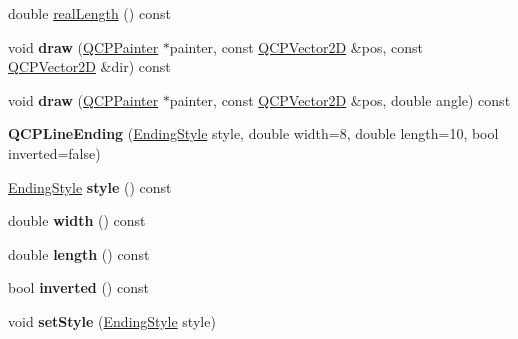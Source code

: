 \begin{DoxyCompactItemize}
double \hyperlink{class_q_c_p_line_ending_acacd24d386d459b282d3c57f16a5405d}{real\+Length} () const
\item 
\mbox{\label{class_q_c_p_line_ending_a4f45db54f2aba03acf055e29aec1e8e7}} 
void {\bfseries draw} (\hyperlink{class_q_c_p_painter}{Q\+C\+P\+Painter} $\ast$painter, const \hyperlink{class_q_c_p_vector2_d}{Q\+C\+P\+Vector2D} \&pos, const \hyperlink{class_q_c_p_vector2_d}{Q\+C\+P\+Vector2D} \&dir) const
\item 
\mbox{\label{class_q_c_p_line_ending_af7ac30a81ba85b9bded148c6ec387391}} 
void {\bfseries draw} (\hyperlink{class_q_c_p_painter}{Q\+C\+P\+Painter} $\ast$painter, const \hyperlink{class_q_c_p_vector2_d}{Q\+C\+P\+Vector2D} \&pos, double angle) const
\item 
\mbox{\label{class_q_c_p_line_ending_abb2abc7542f0c7a3c081d878248896a4}} 
{\bfseries Q\+C\+P\+Line\+Ending} (\hyperlink{class_q_c_p_line_ending_a5ef16e6876b4b74959c7261d8d4c2cd5}{Ending\+Style} style, double width=8, double length=10, bool inverted=false)
\item 
\mbox{\label{class_q_c_p_line_ending_a07e75aaac6c61322bf51af237c5778e3}} 
\hyperlink{class_q_c_p_line_ending_a5ef16e6876b4b74959c7261d8d4c2cd5}{Ending\+Style} {\bfseries style} () const
\item 
\mbox{\label{class_q_c_p_line_ending_ae6f1fb83c210da6ace35d629993287f3}} 
double {\bfseries width} () const
\item 
\mbox{\label{class_q_c_p_line_ending_aee9050a13fe115bd1b6794f9ad14cd72}} 
double {\bfseries length} () const
\item 
\mbox{\label{class_q_c_p_line_ending_a15a68706d298a0c9f94556f6b4db15ff}} 
bool {\bfseries inverted} () const
\item 
\mbox{\label{class_q_c_p_line_ending_a56953b9cb8ed1bed0f025c3935f16910}} 
void {\bfseries set\+Style} (\hyperlink{class_q_c_p_line_ending_a5ef16e6876b4b74959c7261d8d4c2cd5}{Ending\+Style} style)
\item 

\end{DoxyCompactItemize}

